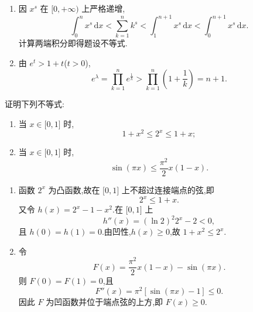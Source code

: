 \begin{solution}
    \leavevmode
    \begin{enumerate}
        \item 因 $x^s$ 在 $\lbrack0,+\infty)$ 上严格递增,
              \[
                  \displaystyle\int_0^n x^s\,\mathrm{d}x
                  <\sum\limits_{k=1}^{n}k^s
                  <\int_1^{n+1}x^s\,\mathrm{d}x
                  <\int_0^{n+1}x^s\,\mathrm{d}x.
              \]
              计算两端积分即得题设不等式.

        \item 由 $e^t>1+t$($t>0$),
              \[
                  e^\lambda
                  =\prod\limits_{k=1}^{n}e^{\frac{1}{k}}
                  >\prod\limits_{k=1}^{n}\left(1+\dfrac{1}{k}\right)
                  =n+1.
              \]
    \end{enumerate}
\end{solution}




\begin{example}
    证明下列不等式:
    \begin{enumerate}
        \item 当 $x\in\lbrack 0,1\rbrack$ 时,
              \[
                  1+x^2\leq2^x\leq1+x;
              \]
        \item 当 $x\in\lbrack 0,1\rbrack$ 时,
              \[
                  \sin(\pi x)\leq\dfrac{\pi^2}{2}x(1-x).
              \]
    \end{enumerate}
\end{example}
\exampleblank

\begin{solution}
    \leavevmode
    \begin{enumerate}
        \item 函数 $2^x$ 为凸函数,故在 $\lbrack0,1\rbrack$ 上不超过连接端点的弦,即
              \[
                  2^x\leq1+x.
              \]
              又令 $h(x)=2^x-1-x^2$.在 $\lbrack0,1\rbrack$ 上
              \[
                  h''(x)=(\ln2)^2 2^x-2<0,
              \]
              且 $h(0)=h(1)=0$.由凹性,$h(x)\geq0$,故 $1+x^2\leq2^x$.

        \item 令
              \[
                  F(x)=\dfrac{\pi^2}{2}x(1-x)-\sin(\pi x).
              \]
              则 $F(0)=F(1)=0$,且
              \[
                  F''(x)=\pi^2[\sin(\pi x)-1]\leq0.
              \]
              因此 $F$ 为凹函数并位于端点弦的上方,即 $F(x)\geq0$.
    \end{enumerate}
\end{solution}


